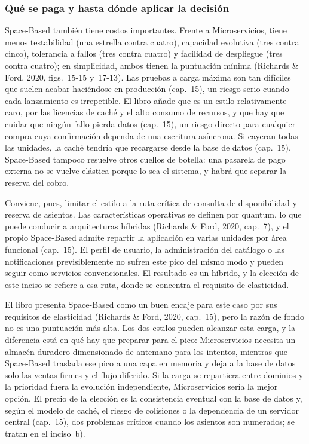 \subsubsection{Qué se paga y hasta dónde aplicar la decisión}

Space-Based también tiene costos importantes. Frente a Microservicios, tiene menos
testabilidad (una estrella contra cuatro), capacidad evolutiva (tres contra cinco),
tolerancia a fallos (tres contra cuatro) y facilidad de despliegue (tres contra
cuatro); en simplicidad, ambos tienen la puntuación mínima (Richards \& Ford, 2020,
figs.~15-15 y~17-13). Las pruebas a carga máxima son tan difíciles que suelen acabar
haciéndose en producción (cap.~15), un riesgo serio cuando cada lanzamiento es
irrepetible. El libro añade que es un estilo relativamente caro, por las licencias de
caché y el alto consumo de recursos, y que hay que cuidar que ningún fallo pierda
datos (cap.~15), un riesgo directo para cualquier compra cuya confirmación dependa de una
escritura asíncrona. Si cayeran todas las unidades, la caché tendría que recargarse desde la
base de datos (cap.~15). Space-Based tampoco resuelve otros cuellos de botella: una
pasarela de pago externa no se vuelve elástica porque lo sea el sistema, y habrá que
separar la reserva del cobro.

Conviene, pues, limitar el estilo a la ruta crítica de consulta de disponibilidad y
reserva de asientos. Las características operativas se definen por quantum, lo que
puede conducir a arquitecturas híbridas (Richards \& Ford, 2020, cap.~7), y el propio
Space-Based admite repartir la aplicación en varias unidades por área funcional
(cap.~15). El perfil de usuario, la administración del catálogo o las notificaciones
previsiblemente no sufren este pico del mismo modo y pueden seguir como servicios
convencionales. El resultado es un híbrido, y la elección de este inciso se refiere a
esa ruta, donde se concentra el requisito de elasticidad.

El libro presenta Space-Based como un buen encaje para este caso por sus requisitos
de elasticidad (Richards \& Ford, 2020, cap.~15), pero la razón de fondo no es una
puntuación más alta. Los dos estilos pueden alcanzar esta carga, y la diferencia está
en qué hay que preparar para el pico: Microservicios necesita un almacén duradero
dimensionado de antemano para los intentos, mientras que Space-Based traslada ese
pico a una capa en memoria y deja a la base de datos solo las ventas firmes y el flujo diferido. Si la
carga se repartiera entre dominios y la prioridad fuera la evolución independiente,
Microservicios sería la mejor opción. El precio de la elección es la consistencia
eventual con la base de datos y, según el modelo de caché, el riesgo de colisiones o
la dependencia de un servidor central (cap.~15), dos problemas críticos cuando los
asientos son numerados; se tratan en el inciso~b).
